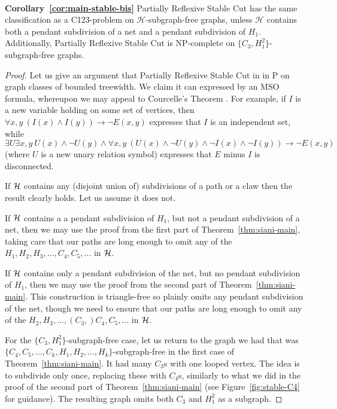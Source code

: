 \documentclass[a4paper,UKenglish,cleveref, autoref,thm-restate]{lipics-v2021}
\begin{document}
\


\noindent \textbf{Corollary~\ref{cor:main-stable-bis}}
{\sc Partially Reflexive Stable Cut} has the same classification as a C123-problem on $\mathcal{H}$-subgraph-free graphs, unless $\mathcal{H}$ contains both a pendant subdivision of a net and a pendant subdivision of $H_1$. Additionally, {\sc Partially Reflexive Stable Cut} is NP-complete on $\{C_3,H_1^2\}$-subgraph-free graphs.

\begin{proof}
Let us give an argument that {\sc Partially Reflexive Stable Cut} in in P on graph classes of bounded treewidth. We claim it can expressed by an $\textrm{MSO}$ formula, whereupon we may appeal to Courcelle's Theorem \cite{Courcelle}. For example, if $I$ is a new variable holding on some set of vertices, then $\forall x,y \ (I(x) \wedge I(y)) \rightarrow \neg E(x,y)$ 
    expresses that $I$ is an independent set, while
    \[
    \exists U \exists x, y \ U(x) \wedge \neg U(y) \wedge \forall x, y \ (U(x) \wedge \neg U(y) \wedge \neg I(x) \wedge \neg I(y)) \rightarrow \neg E(x,y)    
    \]
    (where $U$ is a new unary relation symbol) expresses that $E$ minus $I$ is disconnected.

If $\cal{H}$ contains any (disjoint union of) subdivisions of a path or a claw then the result clearly holds. Let us assume it does not.

If $\cal{H}$ contains a a pendant subdivision of $H_1$, but not a pendant subdivision of a net, then we may use the proof from the first part of Theorem~\ref{thm:siani-main}, taking care that our paths are long enough to omit any of the $H_1, H_2, H_3, \ldots, C_4, C_5, \ldots$ in ${\cal H}$.

If $\cal{H}$ contains only a pendant subdivision of the net, but no pendant subdivision of $H_1$, then we may use the proof from the second part of Theorem~\ref{thm:siani-main}. This construction is triangle-free so plainly omits any pendant subdivision of the net, though we need to ensure that our paths are long enough to omit any of the $H_2, H_3, \ldots, (C_3,) C_4, C_5, \ldots$ in ${\cal H}$.

For the $\{C_3,H_1^2\}$-subgraph-free case, let us return to the graph we had that was $\{C_4,C_5,\ldots,C_k,H_1,H_2,\ldots,H_k\}$-subgraph-free in the first case of Theorem~\ref{thm:siani-main}. It had many $C_3$s with one looped vertex. The idea is to subdivide only once, replacing these with $C_4$s, similarly to what we did in the proof of the second part of Theorem~\ref{thm:siani-main} (see Figure~\ref{fig:stable-C4} for guidance). The resulting graph omits both $C_3$ and $H_1^2$ as a subgraph.%
\end{proof}
\end{document}
